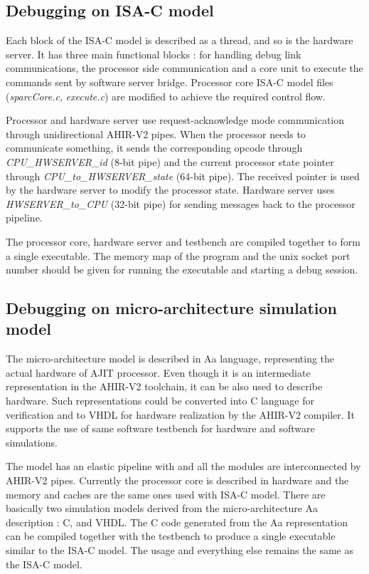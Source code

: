 \subsection{Debugging on ISA-C model}
Each block of the ISA-C model is described as a thread, and so is the hardware server. It has three main functional blocks : for handling debug link communications, the processor side communication and a core unit to execute the commands sent by software server bridge. Processor core ISA-C model files (\textit{sparcCore.c}, \textit{execute.c}) are modified to achieve the required control flow.

Processor and hardware server use request-acknowledge mode communication through unidirectional AHIR-V2 pipes. When the processor needs to communicate something, it sends the corresponding opcode through \textit{CPU\_HWSERVER\_id} (8-bit pipe) and the current processor state pointer through \textit{CPU\_to\_HWSERVER\_state} (64-bit pipe). The received pointer is used by the hardware server to modify the processor state. Hardware server uses \textit{HWSERVER\_to\_CPU} (32-bit pipe) for sending messages back to the processor pipeline. 

The processor core, hardware server and testbench are compiled together to form a single executable. The memory map of the program and the unix socket port number should be given for running the executable and starting a debug session.

\subsection{Debugging on micro-architecture simulation model}
The micro-architecture model is described in Aa\cite{aaLRM} language, representing the actual hardware of AJIT processor. Even though it is an intermediate representation in the AHIR-V2 toolchain, it can be also used to describe hardware. Such representations could be converted into C language for verification and to VHDL for hardware realization by the AHIR-V2 compiler. It supports the use of same software testbench for hardware and software simulations.

The model has an elastic pipeline with and all the modules are interconnected by AHIR-V2 pipes.
Currently the processor core is described in hardware and the memory and caches are the same ones used with ISA-C model. There are basically two simulation models derived from the micro-architecture Aa description : C, and VHDL. The C code generated from the Aa representation can be compiled together with the testbench to produce a single executable similar to the ISA-C model. The usage and everything else remains the same as the ISA-C model.

